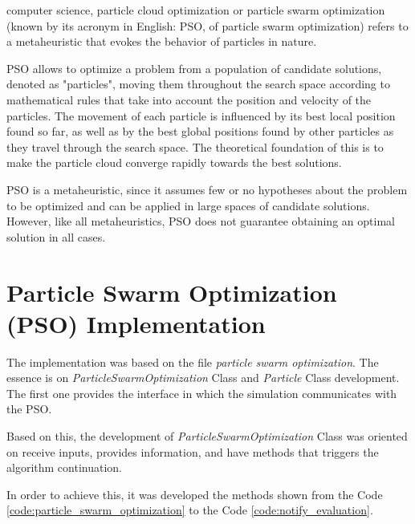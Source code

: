  computer science, particle cloud optimization or particle swarm optimization (known by its acronym in English: PSO, of particle swarm optimization) refers to a metaheuristic that evokes the behavior of particles in nature.

PSO allows to optimize a problem from a population of candidate solutions, denoted as "particles", moving them throughout the search space according to mathematical rules that take into account the position and velocity of the particles. The movement of each particle is influenced by its best local position found so far, as well as by the best global positions found by other particles as they travel through the search space. The theoretical foundation of this is to make the particle cloud converge rapidly towards the best solutions.

PSO is a metaheuristic, since it assumes few or no hypotheses about the problem to be optimized and can be applied in large spaces of candidate solutions. However, like all metaheuristics, PSO does not guarantee obtaining an optimal solution in all cases.


\section{Particle Swarm Optimization (PSO) Implementation}

The implementation was based on the file \textit{particle swarm optimization}. The essence is on \textit{ParticleSwarmOptimization} Class and \textit{Particle} Class development. The first one provides the interface in which the simulation communicates with the PSO.

Based on this, the development of \textit{ParticleSwarmOptimization} Class was oriented on receive inputs, provides information, and have methods that triggers the algorithm continuation.

In order to achieve this, it was developed the methods shown from the Code \ref{code:particle_swarm_optimization} to the Code \ref{code:notify_evaluation}.





